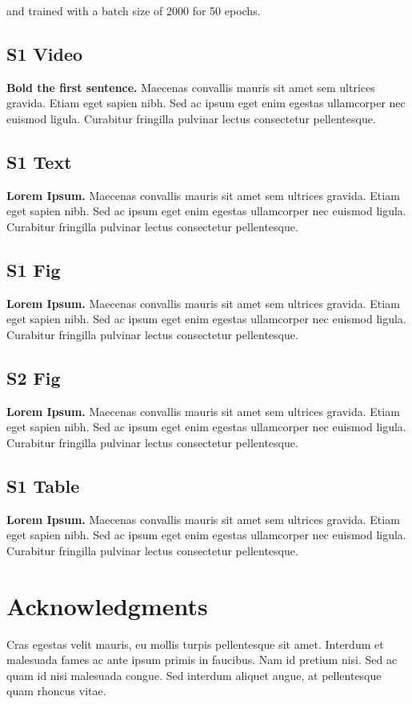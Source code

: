 \documentclass[10pt,letterpaper]{article}
\begin{document}
and trained with a batch size of 2000 for 50 epochs.

\subsection*{S1 Video}
\label{S1_Video}
{\bf Bold the first sentence.}  Maecenas convallis mauris sit amet sem ultrices gravida. Etiam eget sapien nibh. Sed ac ipsum eget enim egestas ullamcorper nec euismod ligula. Curabitur fringilla pulvinar lectus consectetur pellentesque.

\subsection*{S1 Text}
\label{S1_Text}
{\bf Lorem Ipsum.} Maecenas convallis mauris sit amet sem ultrices gravida. Etiam eget sapien nibh. Sed ac ipsum eget enim egestas ullamcorper nec euismod ligula. Curabitur fringilla pulvinar lectus consectetur pellentesque.

\subsection*{S1 Fig}
\label{S1_Fig}
{\bf Lorem Ipsum.} Maecenas convallis mauris sit amet sem ultrices gravida. Etiam eget sapien nibh. Sed ac ipsum eget enim egestas ullamcorper nec euismod ligula. Curabitur fringilla pulvinar lectus consectetur pellentesque.

\subsection*{S2 Fig}
\label{S2_Fig}
{\bf Lorem Ipsum.} Maecenas convallis mauris sit amet sem ultrices gravida. Etiam eget sapien nibh. Sed ac ipsum eget enim egestas ullamcorper nec euismod ligula. Curabitur fringilla pulvinar lectus consectetur pellentesque.

\subsection*{S1 Table}
\label{S1_Table}
{\bf Lorem Ipsum.} Maecenas convallis mauris sit amet sem ultrices gravida. Etiam eget sapien nibh. Sed ac ipsum eget enim egestas ullamcorper nec euismod ligula. Curabitur fringilla pulvinar lectus consectetur pellentesque.

\section*{Acknowledgments}
Cras egestas velit mauris, eu mollis turpis pellentesque sit amet. Interdum et malesuada fames ac ante ipsum primis in faucibus. Nam id pretium nisi. Sed ac quam id nisi malesuada congue. Sed interdum aliquet augue, at pellentesque quam rhoncus vitae.
\end{document}
